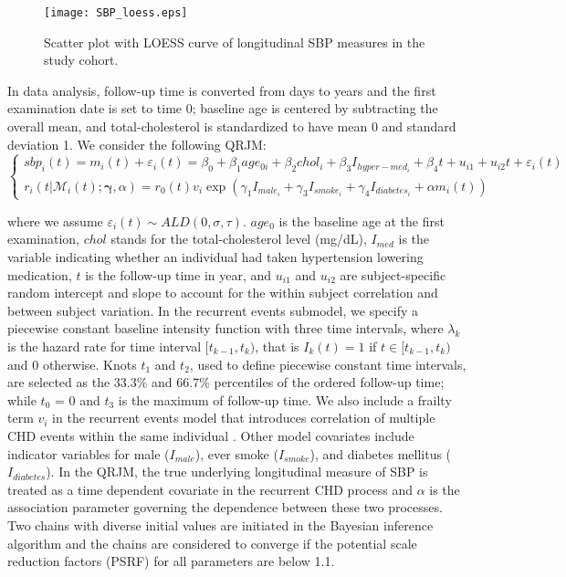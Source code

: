 \begin{figure}[H]
\centering
\texttt{[image: SBP\_loess.eps]}
\caption{Scatter plot with LOESS curve of longitudinal SBP measures in the study cohort.}
\label{fig:p2_sbp_loess}
\end{figure}

In data analysis, follow-up time is converted from days to years and the first examination date is set to time 0; baseline age is centered by subtracting the overall mean, and total-cholesterol is standardized to have mean 0 and standard deviation 1. We consider the following QRJM:
\small{
\begin{equation*}\label{eqn:p2data_joint}
\left\{
\begin{array}{l}
sbp_{i}(t) = m_{i}(t) + \varepsilon_{i}(t) = \beta_0 + \beta_1 age_{0i} + \beta_2 chol_i + \beta_3 I_{hyper-med_i}+ \beta_4 t + {u}_{i1} + u_{i2} t + \varepsilon_{i}(t)\\
r_i(t|\mathcal{M}_{i}(t);  \boldsymbol{\gamma}, \alpha) = r_{0}(t)v_i\exp(\gamma_1 I_{male_i} + \gamma_3 I_{smoke_i} + \gamma_4I_{diabetes_i} + \alpha m_i(t))
\end{array}
\right.
\end{equation*}
}

\noindent where we assume  $\varepsilon_{i}(t)\sim ALD(0, \sigma, \tau)$. $age_0$ is the baseline age at the first examination, $chol$ stands for the total-cholesterol level (mg/dL), $I_{med}$ is the variable indicating whether an individual had taken hypertension lowering medication, $t$ is the follow-up time in year, and $u_{i1}$ and $u_{i2}$ are subject-specific random intercept and slope to account for the within subject correlation and between subject variation. In the recurrent events submodel, we specify a piecewise constant baseline intensity function with three time intervals, where $\lambda_k$ is the hazard rate for time interval $[t_{k-1}, t_{k})$, that is $I_k(t)=1$ if $t\in[t_{k-1}, t_{k})$ and 0 otherwise. Knots $t_1$ and $t_2$, used to define piecewise constant time intervals, are selected as the 33.3\% and 66.7\% percentiles of the ordered follow-up time; while $t_0$ = 0 and $t_3$ is the maximum of follow-up time. We also include a frailty term $v_i$ in the recurrent events model that introduces correlation of multiple CHD events within the same individual \citep{hougaard2012analysis}. Other model covariates include indicator variables for male ($I_{male}$), ever smoke ($I_{smoke}$), and diabetes mellitus ($I_{diabetes}$). In the QRJM, the true underlying longitudinal measure of SBP is treated as a time dependent covariate in the recurrent CHD process and $\alpha$ is the association parameter governing the dependence between these two processes. Two chains with diverse initial values are initiated in the Bayesian inference algorithm and the chains are considered to converge if the potential scale reduction factors (PSRF)\citep{brooks1998general} for all parameters are below 1.1.



